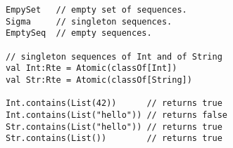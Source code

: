 \begin{lstlisting}[style=scalaioScala]
EmpySet   // empty set of sequences.
Sigma     // singleton sequences.
EmptySeq  // empty sequences.

// singleton sequences of Int and of String
val Int:Rte = Atomic(classOf[Int])    
val Str:Rte = Atomic(classOf[String])

Int.contains(List(42))      // returns true
Int.contains(List("hello")) // returns false
Str.contains(List("hello")) // returns true
Str.contains(List())        // returns true
\end{lstlisting}

